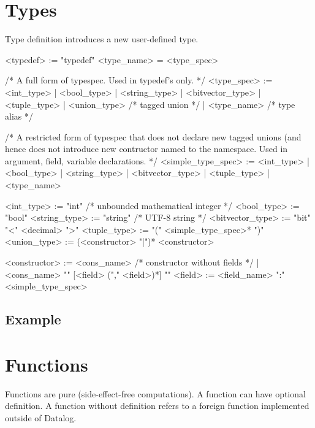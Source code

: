 \documentclass{report}
\newcommand{\lang}{Datalog\xspace}
\begin{document}
\section{Types}

Type definition introduces a new user-defined type.

\begin{bnflisting}{}
<typedef> := "typedef" <type_name> = <type_spec>
\end{bnflisting}

\begin{bnflisting}{}
/* A full form of typespec. Used in typedef's only. */
<type_spec> := <int_type>
             | <bool_type>
             | <string_type>
             | <bitvector_type>
             | <tuple_type>
             | <union_type>     /* tagged union */
             | <type_name>      /* type alias */

/* A restricted form of typespec that does not declare new tagged
    unions (and hence does not introduce new contructor named to
    the namespace.  Used in argument, field, variable declarations. */
<simple_type_spec> := <int_type>
                    | <bool_type>
                    | <string_type>
                    | <bitvector_type>
                    | <tuple_type>
                    | <type_name>

\end{bnflisting}

\begin{bnflisting}{}
<int_type>         := "int" /* unbounded mathematical integer */
<bool_type>        := "bool"
<string_type>      := "string" /* UTF-8 string */
<bitvector_type>   := "bit" "<" <decimal> ">"
<tuple_type>       := "(" <simple_type_spec>* ")"
<union_type>      := (<constructor> "|")* <constructor>

<constructor>      := <cons_name> /* constructor without fields */
                    | <cons_name> "{" [<field> ("," <field>)*] "}"
<field> := <field_name> ":" <simple_type_spec> 
\end{bnflisting}

\subsection*{Example}

\section{Functions}

Functions are pure (side-effect-free computations).  A function can have 
optional definition.  A function without definition refers to a
foreign function implemented outside of \lang.
\end{document}
